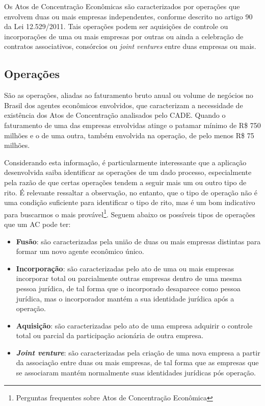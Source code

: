\documentclass[11pt]{report}
\begin{document}
\indent\indent Os Atos de Concentração Econômicas são caracterizados por operações que envolvem duas ou mais empresas independentes, conforme descrito no artigo 90 da Lei 12.529/2011. Tais operações
podem ser aquisições de controle ou incorporações de uma ou mais empresas por outras ou ainda a celebração de contratos associativos, consórcios ou \textit{joint ventures} entre duas
empresas ou mais.

\subsection{Operações}

\indent\indent São as operações, aliadas ao faturamento bruto anual ou volume de negócios no Brasil dos agentes econômicos envolvidos, que caracterizam a necessidade de existência dos
Atos de Concentração analisados pelo CADE. Quando o faturamento de uma das empresas envolvidas atinge o patamar mínimo de R\$ 750 milhões e o de uma outra, também envolvida na operação,
de pelo menos R\$ 75 milhões.

Considerando esta informação, é particularmente interessante que a aplicação desenvolvida saiba identificar as operações de um dado processo, especialmente
pela razão de que certas operações tendem a seguir mais um ou outro tipo de rito. É relevante ressaltar a observação, no entanto, que o tipo de operação não é uma condição suficiente
para identificar o tipo de rito, mas é um bom indicativo para buscarmos o mais provável\footnote[4]{Perguntas frequentes sobre Atos de Concentração Econômica}. Seguem abaixo
os possíveis tipos de operações que um AC pode ter:

\begin{itemize}
  \item \textbf{Fusão}: são caracterizadas pela união de duas ou mais empresas distintas para formar um novo agente econômico único.
  \item \textbf{Incorporação}: são caracterizadas pelo ato de uma ou mais empresas incorporar total ou parcialmente outras empresas dentro de uma mesma pessoa jurídica,
  de tal forma que o incorporado desaparece como pessoa jurídica, mas o incorporador mantém a sua identidade jurídica após a operação.
  \item \textbf{Aquisição}: são caracterizadas pelo ato de uma empresa adquirir o controle total ou parcial da participação acionária de outra empresa.
  \item \textbf{\textit{Joint venture}}: são caracterizadas pela criação de uma nova empresa a partir da associação entre duas ou mais empresas, de tal forma
  que as empresas que se associaram mantém normalmente suas identidades jurídicas pós operação.
\end{itemize}
\end{document}

